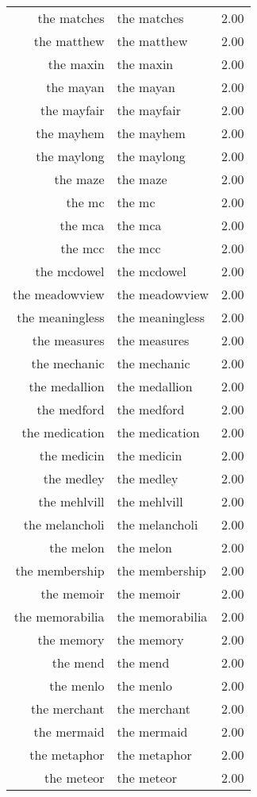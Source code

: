 \begin{table}[ht]
\begin{tabular}{rlr}
  the matches & the matches & 2.00 \\ 
  the matthew & the matthew & 2.00 \\ 
  the maxin & the maxin & 2.00 \\ 
  the mayan & the mayan & 2.00 \\ 
  the mayfair & the mayfair & 2.00 \\ 
  the mayhem & the mayhem & 2.00 \\ 
  the maylong & the maylong & 2.00 \\ 
  the maze & the maze & 2.00 \\ 
  the mc & the mc & 2.00 \\ 
  the mca & the mca & 2.00 \\ 
  the mcc & the mcc & 2.00 \\ 
  the mcdowel & the mcdowel & 2.00 \\ 
  the meadowview & the meadowview & 2.00 \\ 
  the meaningless & the meaningless & 2.00 \\ 
  the measures & the measures & 2.00 \\ 
  the mechanic & the mechanic & 2.00 \\ 
  the medallion & the medallion & 2.00 \\ 
  the medford & the medford & 2.00 \\ 
  the medication & the medication & 2.00 \\ 
  the medicin & the medicin & 2.00 \\ 
  the medley & the medley & 2.00 \\ 
  the mehlvill & the mehlvill & 2.00 \\ 
  the melancholi & the melancholi & 2.00 \\ 
  the melon & the melon & 2.00 \\ 
  the membership & the membership & 2.00 \\ 
  the memoir & the memoir & 2.00 \\ 
  the memorabilia & the memorabilia & 2.00 \\ 
  the memory & the memory & 2.00 \\ 
  the mend & the mend & 2.00 \\ 
  the menlo & the menlo & 2.00 \\ 
  the merchant & the merchant & 2.00 \\ 
  the mermaid & the mermaid & 2.00 \\ 
  the metaphor & the metaphor & 2.00 \\ 
  the meteor & the meteor & 2.00 \\ 

\end{tabular}
\end{table}
